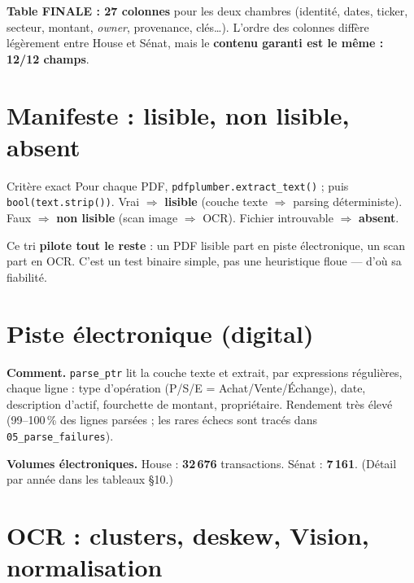 \documentclass[11pt,a4paper]{article}
\newcommand{\code}[1]{\texttt{\small #1}}
\begin{document}
\textbf{Table FINALE : 27 colonnes} pour les deux chambres (identité, dates, ticker, secteur, montant,
\emph{owner}, provenance, clés\dots). L'ordre des colonnes diffère légèrement entre House et Sénat, mais
le \textbf{contenu garanti est le même : 12/12 champs}.

\section{Manifeste : lisible, non lisible, absent}

\begin{defbox}{Critère exact}
Pour chaque PDF, \code{pdfplumber.extract\_text()} ; puis \code{bool(text.strip())}. Vrai $\Rightarrow$
\textbf{lisible} (couche texte $\Rightarrow$ parsing déterministe). Faux $\Rightarrow$
\textbf{non lisible} (scan image $\Rightarrow$ OCR). Fichier introuvable $\Rightarrow$ \textbf{absent}.
\end{defbox}

Ce tri \textbf{pilote tout le reste} : un PDF lisible part en piste électronique, un scan part en OCR.
C'est un test binaire simple, pas une heuristique floue --- d'où sa fiabilité.

\section{Piste électronique (digital)}

\textbf{Comment.} \code{parse\_ptr} lit la couche texte et extrait, par expressions régulières, chaque
ligne : type d'opération (P/S/E = Achat/Vente/Échange), date, description d'actif, fourchette de montant,
propriétaire. Rendement très élevé (99--100\,\% des lignes parsées ; les rares échecs sont tracés dans
\code{05\_parse\_failures}).

\textbf{Volumes électroniques.} House : \textbf{32\,676} transactions. Sénat : \textbf{7\,161}. (Détail
par année dans les tableaux §10.)

\section{OCR : clusters, deskew, Vision, normalisation}
\end{document}
